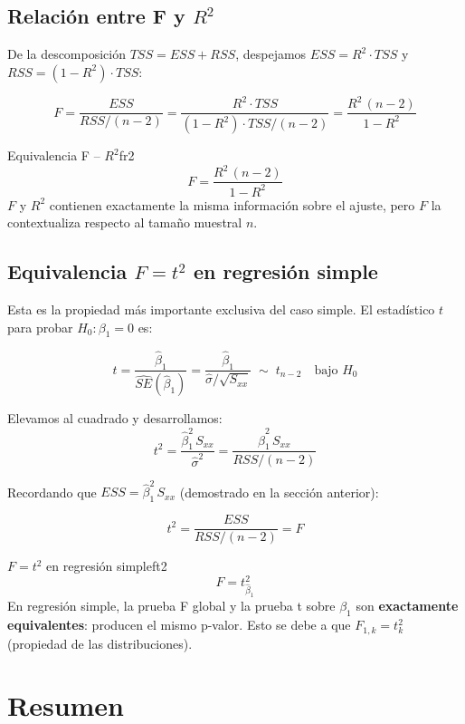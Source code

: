 \documentclass[12pt, a4paper]{article}
\newcommand{\hbeta}{\hat{\beta}}
\newcommand{\sxx}{S_{xx}}
\begin{document}
\subsection{Relación entre F y $R^2$}

De la descomposición $TSS = ESS + RSS$, despejamos $ESS = R^2\cdot TSS$ y
$RSS = (1-R^2)\cdot TSS$:

\[
  F
    = \frac{ESS}{RSS/(n-2)}
    = \frac{R^2\cdot TSS}{(1-R^2)\cdot TSS/(n-2)}
    = \frac{R^2\,(n-2)}{1-R^2}
\]

\begin{resultado}{Equivalencia F -- $R^2$}{fr2}
\[
  \boxed{
    F = \frac{R^2\,(n-2)}{1-R^2}
  }
\]
$F$ y $R^2$ contienen exactamente la misma información sobre el ajuste,
pero $F$ la contextualiza respecto al tamaño muestral $n$.
\end{resultado}

\subsection{Equivalencia $F = t^2$ en regresión simple}

Esta es la propiedad más importante exclusiva del caso simple.
El estadístico $t$ para probar $H_0: \beta_1=0$ es:

\[
  t
    = \frac{\hbeta_1}{\widehat{SE}(\hbeta_1)}
    = \frac{\hbeta_1}{\hat{\sigma}/\sqrt{\sxx}}
    \;\sim\; t_{n-2}
    \quad \text{bajo } H_0
\]

Elevamos al cuadrado y desarrollamos:
\[
  t^2
    = \frac{\hbeta_1^2\,\sxx}{\hat{\sigma}^2}
    = \frac{\hbeta_1^2\,\sxx}{RSS/(n-2)}
\]

Recordando que $ESS = \hbeta_1^2\,\sxx$ (demostrado en la sección anterior):

\[
  t^2
    = \frac{ESS}{RSS/(n-2)}
    = F
\]

\begin{resultado}{$F = t^2$ en regresión simple}{ft2}
\[
  \boxed{F = t^2_{\hbeta_1}}
\]
En regresión simple, la prueba F global y la prueba t sobre $\beta_1$ son
\textbf{exactamente equivalentes}: producen el mismo p-valor. Esto se debe a que
$F_{1,k} = t_k^2$ (propiedad de las distribuciones).
\end{resultado}


\section{Resumen}
\end{document}
